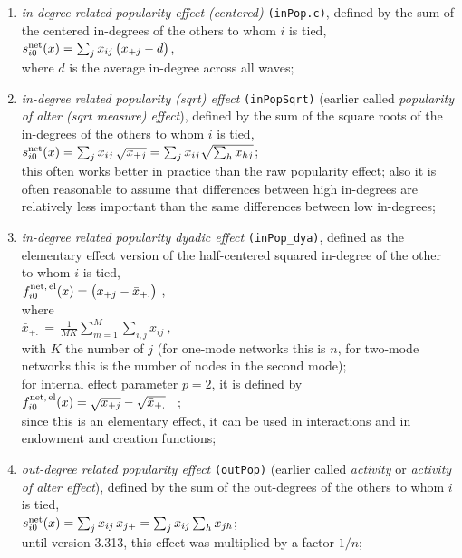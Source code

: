 \documentclass[a4paper,fleqn,11pt]{article}
\newcommand{\+}{\, + \,}
\newcommand{\vit}{\theenumi}
\begin{document}
\begin{enumerate}
 \item {\em in-degree related popularity effect (centered)} \texttt{(inPop.c)},
 defined by the sum of
 the centered in-degrees of the others to whom $i$ is tied,\\
 $s^{\rm net}_{i\vit}(x) =  \sum_j x_{ij}\, \big( x_{+j} - d \big)$,\\
 where $d$ is the average in-degree across all waves;

 \item {\em in-degree related popularity (sqrt) effect} \texttt{(inPopSqrt)}
 (earlier called {\em popularity of alter (sqrt measure) effect}), defined by the sum of
 the square roots of the in-degrees of the others to whom $i$ is tied,\\
 $s^{\rm net}_{i\vit}(x) = \sum_j x_{ij}\, \sqrt{x_{+j}} =
  \sum_j x_{ij} \sqrt{\sum_h x_{hj}} $;\\
 this often works better in practice than the raw popularity effect;
 also it is often reasonable to assume that differences between high in-degrees are
 relatively less important than the same differences between low
 in-degrees;


 \item {\em in-degree related popularity dyadic effect} \texttt{(inPop\_dya)},
 	 defined as the elementary effect version of the half-centered
 squared in-degree of the other to whom $i$ is tied,\\
 $ f^{\rm net,\, el}_{i\vit}(x)  =  \big(  x_{+j} - \bar x_{+.}\big)$ ,\\
 where\\
 $ \bar x_{+.} \,=\,  \frac{1}{MK} \sum_{m=1}^M \sum_{i,j} x_{ij} \ ,  $ \\
 with $K$ the number of $j$ (for one-mode networks this is $n$,
 for two-mode networks this is the number of nodes in the second mode);\\
 for internal effect parameter $p=2$, it is defined by\\
 $f^{\rm net,\, el}_{i\vit}(x)  =   \sqrt{  x_{+j}}  - \sqrt{ \bar x_{+.}} $ \ ; \\
 since this is an elementary effect, it can be used in interactions
 and in endowment and creation functions;

 \item {\em out-degree related popularity effect} \texttt{(outPop)}
 (earlier called {\em activity} or {\em activity of alter effect}), defined by
  the sum of the out-degrees
 of the others to whom $i$ is tied,\\
 $s^{\rm net}_{i\vit}(x) =  \sum_j x_{ij}\, x_{j+} =
  \sum_j x_{ij} \sum_h x_{jh} $; \\
 until version 3.313, this effect was multiplied by a factor $1/n$;


\end{enumerate}
\end{document}
